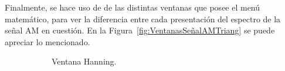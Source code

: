       Finalmente, se hace uso de de las distintas ventanas que posee el menú matemático, para ver la diferencia
      entre cada presentación del espectro de la señal AM en cuestión. En la Figura~\ref{fig:VentanasSeñalAMTriang}
      se puede apreciar lo mencionado.

      \begin{figure}[H]
        \centering
        \begin{subfigure}[H]{0.44\textwidth}
          \caption{Ventana Hanning.}
        \end{subfigure}
        \hfill 
        \begin{subfigure}[H]{0.42\textwidth}

\end{subfigure}
\end{figure}
